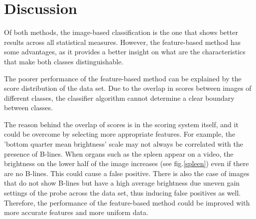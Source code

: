 \documentclass[12pt]{article} %
\begin{document}
\begin{table}[]
\caption{\small Comparison of classification results: feature-based and image-based approaches. The image-based approach showed a better performance across every statistical measure.}
\label{results}
\end{table}


\section{Discussion}

	Of both methods, the image-based classification is the one that shows better results across all statistical measures. However, the feature-based method has some advantages, as it provides a better insight on what are the characteristics that make both classes distinguishable. 
	
	The poorer performance of the feature-based method can be explained by the score distribution of the data set. Due to the overlap in scores between images of different classes, the classifier algorithm cannot determine a clear boundary between classes.
	
	The reason behind the overlap of scores is in the scoring system itself, and it could be overcome by selecting more appropriate features. For example, the 'bottom quarter mean brightness' scale may not always be correlated with the presence of B-lines. When organs such as the spleen appear on a video, the brightness on the lower half of the image increases (see fig.\ref{spleen}) even if there are no B-lines. This could cause a false positive. There is also the case of images that do not show B-lines but have a high average brightness due uneven gain settings of the probe across the data set, thus inducing false positives as well.  Therefore, the performance of the feature-based method could be improved with more accurate features and more uniform data.
	
\end{document}
